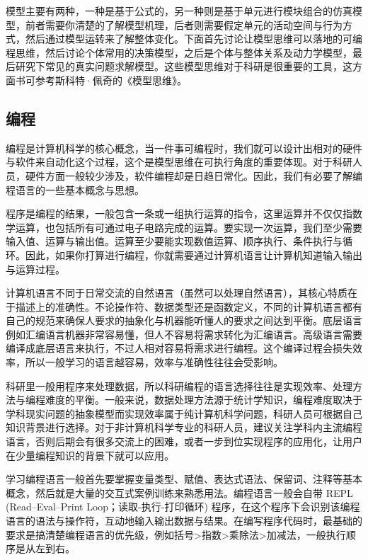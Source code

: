 \documentclass[]{tufte-book}
\begin{document}
模型主要有两种，一种是基于公式的，另一种则是基于单元进行模块组合的仿真模型，前者需要你清楚的了解模型机理，后者则需要假定单元的活动空间与行为方式，然后通过模型运转来了解整体变化。下面首先讨论让模型思维可以落地的可编程思维，然后讨论个体常用的决策模型，之后是个体与整体关系及动力学模型，最后研究下常见的真实问题求解模型。这些模型思维对于科研是很重要的工具，这方面书可参考斯科特·佩奇的《模型思维》。

\hypertarget{ux7f16ux7a0b}{%
\subsection{编程}\label{ux7f16ux7a0b}}

编程是计算机科学的核心概念，当一件事可编程时，我们就可以设计出相对的硬件与软件来自动化这个过程，这个是模型思维在可执行角度的重要体现。对于科研人员，硬件方面一般较少涉及，软件编程却是日趋日常化。因此，我们有必要了解编程语言的一些基本概念与思想。

程序是编程的结果，一般包含一条或一组执行运算的指令，这里运算并不仅仅指数学运算，也包括所有可通过电子电路完成的运算。要实现一次运算，我们至少需要输入值、运算与输出值。运算至少要能实现数值运算、顺序执行、条件执行与循环。因此，如果你打算进行编程，你就需要通过计算机语言让计算机知道输入输出与运算过程。

计算机语言不同于日常交流的自然语言（虽然可以处理自然语言），其核心特质在于描述上的准确性。不论操作符、数据类型还是函数定义，不同的计算机语言都有自己的规范来确保人要求的抽象化与机器能听懂人的要求之间达到平衡。底层语言例如汇编语言机器非常容易懂，但人不容易将需求转化为汇编语言。高级语言需要编译成底层语言来执行，不过人相对容易将需求进行编程。这个编译过程会损失效率，所以一般学习的语言越容易，效率与准确性往往会受影响。

科研里一般用程序来处理数据，所以科研编程的语言选择往往是实现效率、处理方法与编程难度的平衡。一般来说，数据处理方法源于统计学知识，编程难度取决于学科现实问题的抽象模型而实现效率属于纯计算机科学问题，科研人员可根据自己知识背景进行选择。对于非计算机科学专业的科研人员，建议关注学科内主流编程语言，否则后期会有很多交流上的困难，或者一步到位实现程序的应用化，让用户在少量编程知识的背景下就可以应用。

学习编程语言一般首先要掌握变量类型、赋值、表达式语法、保留词、注释等基本概念，然后就是大量的交互式案例训练来熟悉用法。编程语言一般会自带 REPL (Read--Eval--Print Loop；读取-执行-打印循环) 程序，在这个程序下会识别该编程语言的语法与操作符，互动地输入输出数据与结果。在编写程序代码时，最基础的要求是搞清楚编程语言的优先级，例如括号\textgreater 指数\textgreater 乘除法\textgreater 加减法，一般执行顺序是从左到右。
\end{document}
